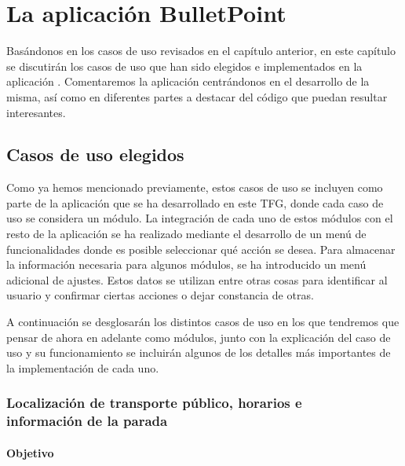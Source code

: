 %
%
%

\chapter{La aplicación BulletPoint} \label{chap:LaAplicacion} 

Basándonos en los casos de uso revisados en el capítulo anterior, en este capítulo se discutirán los casos de uso que han sido elegidos e implementados en la aplicación \BulletPoint{}. Comentaremos la aplicación centrándonos en el desarrollo de la misma, así como  en diferentes partes a destacar del código que puedan resultar interesantes.


\section{Casos de uso elegidos}

Como ya hemos mencionado previamente, estos casos de uso se incluyen como parte de la aplicación que se ha desarrollado en este TFG, donde cada caso de uso se considera un módulo. La integración de cada uno de estos módulos con el resto de la aplicación se ha realizado mediante el desarrollo de un menú de funcionalidades donde es posible seleccionar qué acción se desea. Para almacenar la información necesaria para algunos módulos, se ha introducido un menú adicional de ajustes. Estos datos se utilizan entre otras cosas para identificar al usuario y confirmar ciertas acciones o dejar constancia de otras. 


A continuación se desglosarán los distintos casos de uso en los que tendremos que pensar de ahora en adelante como módulos, junto con la explicación del caso de uso y su funcionamiento se incluirán algunos de los detalles más importantes de la implementación de cada uno.

\subsection{Localización de transporte público, horarios e \\información de la parada}

\subsubsection{Objetivo}


